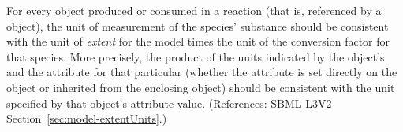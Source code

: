 For every \Species object produced or consumed in a reaction (that is, referenced
by a \SpeciesReference object), the unit of
measurement of the species' substance should be consistent with the unit of 
\emph{extent} for the model times the unit of the conversion
factor for that species.  More precisely, the product of the units indicated by the
\Model object's  and the  attribute for
that particular \Species (whether
the attribute is set directly on the \Species object or inherited from
the enclosing \Model object) should be consistent with the unit specified
by that \Species object's  attribute value.  (References:
SBML L3V2 Section~\ref{sec:model-extentUnits}.)

